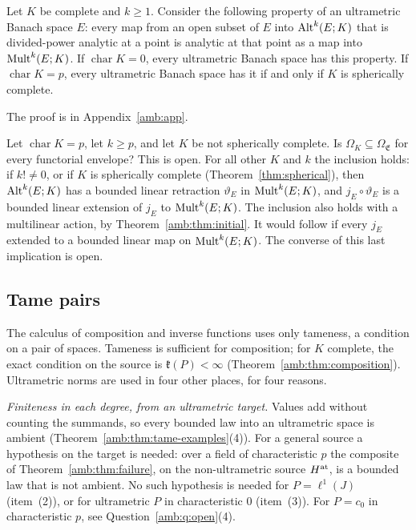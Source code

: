 \begin{corollary}\label{amb:cor:nothing-lost}
Let $K$ be complete and $k\ge1$. Consider the following property of an ultrametric Banach space $E$: every map from an open subset of $E$ into $\operatorname{Alt}^k(E;K)$ that is divided-power analytic at a point is analytic at that point as a map into $\operatorname{Mult}^k(E;K)$. If $\operatorname{char}K=0$, every ultrametric Banach space has this property. If $\operatorname{char}K=p$, every ultrametric Banach space has it if and only if $K$ is spherically complete.
\end{corollary}
The proof is in Appendix~\ref{amb:app}.

\begin{question}\label{amb:q:lower-bound}
Let $\operatorname{char}K=p$, let $k\ge p$, and let $K$ be not spherically complete. Is $\Omega_K\subseteq\Omega_{\mathfrak E}$ for every functorial envelope? This is open. For all other $K$ and $k$ the inclusion holds: if $k!\ne0$, or if $K$ is spherically complete (Theorem~\ref{thm:spherical}), then $\operatorname{Alt}^k(E;K)$ has a bounded linear retraction $\vartheta_E$ in $\operatorname{Mult}^k(E;K)$, and $j_E\circ\vartheta_E$ is a bounded linear extension of $j_E$ to $\operatorname{Mult}^k(E;K)$. The inclusion also holds with a multilinear action, by Theorem~\ref{amb:thm:initial}. It would follow if every $j_E$ extended to a bounded linear map on $\operatorname{Mult}^k(E;K)$. The converse of this last implication is open.
\end{question}

\subsection{Tame pairs}\label{amb:ssec:tame}

The calculus of composition and inverse functions uses only tameness, a condition on a pair of spaces. Tameness is sufficient for composition; for $K$ complete, the exact condition on the source is $\mathfrak k(P)<\infty$ (Theorem~\ref{amb:thm:composition}). Ultrametric norms are used in four other places, for four reasons.

\emph{Finiteness in each degree, from an ultrametric target.} Values add without counting the summands, so every bounded law into an ultrametric space is ambient (Theorem~\ref{amb:thm:tame-examples}(4)). For a general source a hypothesis on the target is needed: over a field of characteristic $p$ the composite of Theorem~\ref{amb:thm:failure}, on the non-ultrametric source $H^{\rm at}$, is a bounded law that is not ambient. No such hypothesis is needed for $P=\ell^1(J)$ (item~(2)), or for ultrametric $P$ in characteristic $0$ (item~(3)). For $P=c_0$ in characteristic $p$, see Question~\ref{amb:q:open}(4).

